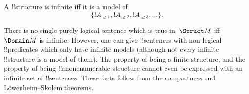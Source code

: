 \documentclass[../../../include/open-logic-section]{subfiles}
\begin{document}
\begin{prop}
A !!{structure} is infinite iff it is a model of
\[
\{!A_{\ge 1}, !A_{\ge 2}, !A_{\ge 3}, \dots \}.
\]
\end{prop}

There is no single purely logical sentence which is true in~$\Struct
M$ iff $\Domain M$ is infinite.  However, one can give !!{sentence}s with
non-logical !!{predicate}s which only have infinite models (although
not every infinite !!{structure} is a model of them).  The property of
being a finite structure, and the property of being
!!a{nonenumerable} structure cannot even be expressed with an infinite
set of !!{sentence}s.  These facts follow from the compactness and
L\"owenheim--Skolem theorems.
\end{document}
